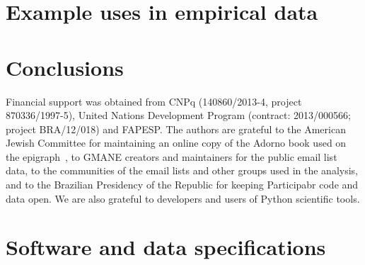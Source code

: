 \documentclass[%
	aip,
	jmp,%
	amsmath,amssymb,
	reprint,%
]{revtex4-1}
\begin{document}
\section{Example uses in empirical data}\label{sec:empirical}
\section{Conclusions}\label{sec:conc}
\begin{acknowledgments}
	Financial support was obtained from CNPq (140860/2013-4,
	project 870336/1997-5), United Nations Development Program (contract: 2013/000566; project BRA/12/018) and FAPESP. 
	The authors are grateful to the American Jewish Committee for maintaining an online copy of the Adorno book used on the epigraph~\cite{adorno}, to GMANE creators and maintainers for the public email list data, to the communities of the email lists and other groups used in the analysis, and to the Brazilian Presidency of the Republic for keeping Participabr code and data open.
	We are also grateful to developers and users of Python scientific tools.
\end{acknowledgments}


\appendix
\section{Software and data specifications}\label{ap:soft}


\end{document}
